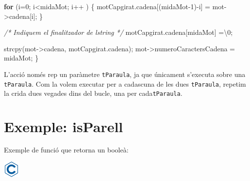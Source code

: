 \documentclass[
]{book}
\newenvironment{Shaded}{\begin{snugshade}}{\end{snugshade}}
\newcommand{\CharTok}[1]{\textcolor[rgb]{0.31,0.60,0.02}{#1}}
\newcommand{\CommentTok}[1]{\textcolor[rgb]{0.56,0.35,0.01}{\textit{#1}}}
\newcommand{\ControlFlowTok}[1]{\textcolor[rgb]{0.13,0.29,0.53}{\textbf{#1}}}
\newcommand{\DecValTok}[1]{\textcolor[rgb]{0.00,0.00,0.81}{#1}}
\newcommand{\NormalTok}[1]{#1}
\begin{document}
\begin{Shaded}
\begin{Highlighting}[]
    \ControlFlowTok{for}\NormalTok{ (i=}\DecValTok{0}\NormalTok{; i\textless{}midaMot; i++ ) \{}
\NormalTok{        motCapgirat.cadena[(midaMot{-}}\DecValTok{1}\NormalTok{){-}i] = mot{-}\textgreater{}cadena[i];}
\NormalTok{    \}}
    
    \CommentTok{/* Indiquem el finalitzador de l\textquotesingle{}string */}
\NormalTok{    motCapgirat.cadena[midaMot] =}\CharTok{\textquotesingle{}\textbackslash{}0\textquotesingle{}}\NormalTok{;}
    
\NormalTok{    strcpy(mot{-}\textgreater{}cadena, motCapgirat.cadena);}
\NormalTok{    mot{-}\textgreater{}numeroCaractersCadena = midaMot;}
\NormalTok{\}}
\end{Highlighting}
\end{Shaded}

L'acció només rep un paràmetre \texttt{tParaula}, ja que únicament s'executa sobre una \texttt{tParaula}. Com la volem executar per a cadascuna de les dues \texttt{tParaula}, repetim la crida dues vegades dins del bucle, una per cada\texttt{tParaula}.

\hypertarget{exemple-isparell}{%
\section{Exemple: isParell}\label{exemple-isparell}}

Exemple de funció que retorna un booleà:

\includegraphics{./img/c.png}
\end{document}
